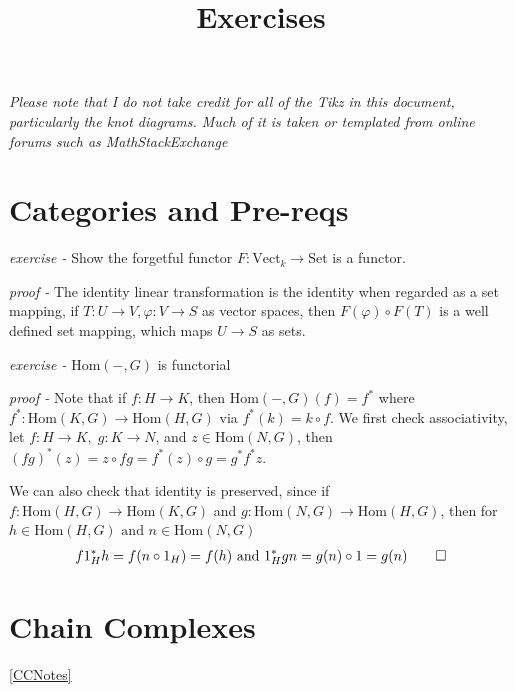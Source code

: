\documentclass[11pt]{article}
\title{Exercises}
\theoremstyle{definition}
\newcommand{\tand}{\text{ and }}
\newcommand{\homo}{\text{Hom}}
\begin{document}
\maketitle
\emph{Please note that I do not take credit for all of the Tikz in this document, particularly the knot diagrams. Much of it is taken or templated from online forums such as MathStackExchange}

\section{Categories and Pre-reqs}

\emph{exercise - }\label{PreEx1} Show the forgetful functor \(F: \text{Vect}_k \to \text{Set}\) is a functor.

\emph{proof - } The identity linear transformation is the identity when regarded as a set mapping, if \(T: U \to V, \varphi: V \to S\) as vector spaces, then \(F(\varphi)\circ F(T)\) is a well defined set mapping, which maps \(U \to S\) as sets.


\emph{exercise - }\label{PreEx2} \(\homo(-,G)\) is functorial

\emph{proof - } Note that if \(f: H \to K\), then \(\homo(-,G)(f) = f^*\) where \(f^*: \homo(K,G) \to \homo(H,G)\) via \(f^*(k) = k \circ f\). We first check associativity, let \(f: H \to K,\; g: K \to N\), and \(z \in \homo(N,G)\), then \((fg)^*(z) = z \circ fg = f^*(z)\circ g = g^*f^*z\).

We can also check that identity is preserved, since if \(f: \homo(H,G) \to \homo(K,G)\) and \(g: \homo(N,G) \to \homo(H,G)\), then for \(h \in \homo(H,G) \tand n \in \homo(N,G)\)
\begin{align*}
    f 1_H^* h = f (n \circ 1_H) = f(h) \tand 1_H^*gn = g(n) \circ 1 = g(n) \qed
\end{align*}


\section{Chain Complexes}\label{CCEx} \ref{CCNotes}
\end{document}
